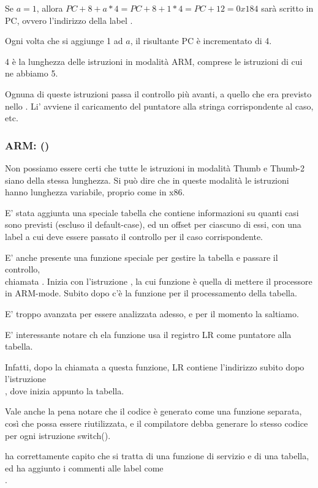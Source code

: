 Se $a=1$, allora $PC+8+a*4 = PC+8+1*4 = PC+12 = 0x184$ sarà scritto in \ac{PC}, ovvero l'indirizzo della label .

Ogni volta che si aggiunge 1 ad $a$, il risultante \ac{PC} è incrementato di 4.

4 è la lunghezza delle istruzioni in modalità ARM, comprese le istruzioni  di cui ne abbiamo 5.

Ognuna di queste istruzioni  passa il controllo più avanti, a quello che era previsto nello .
Li' avviene il caricamento del puntatore alla stringa corrispondente al caso, etc.

\subsubsection{ARM: \OptimizingKeilVI (\ThumbMode)}




Non possiamo essere certi che tutte le istruzioni in modalità Thumb e Thumb-2 siano della stessa lunghezza. Si può dire
che in queste modalità le istruzioni hanno lunghezza variabile, proprio come in x86.


E' stata aggiunta una speciale tabella che contiene informazioni su quanti casi sono previsti (escluso il default-case),
ed un offset per ciascuno di essi, con una label a cui deve essere passato il controllo per il caso corrispondente.



E' anche presente una funzione speciale per gestire la tabella e passare il controllo, \\
chiamata . 
Inizia con l'istruzione , la cui funzione è quella di mettere il processore in ARM-mode.
Subito dopo c'è la funzione per il processamento della tabella.

E' troppo avanzata per essere analizzata adesso, e per il momento la saltiamo.


E' interessante notare ch ela funzione usa il registro \ac{LR} come puntatore alla tabella.

Infatti, dopo la chiamata a questa funzione, \ac{LR} contiene l'indirizzo subito dopo l'istruzione\\
, dove inizia appunto la tabella.

Vale anche la pena notare che il codice è generato come una funzione separata, così che possa essere riutilizzata, e il compilatore
debba generare lo stesso codice per ogni istruzione switch().

\IDA ha correttamente capito che si tratta di una funzione di servizio e di una tabella, ed ha aggiunto i commenti alle label come\\
.

